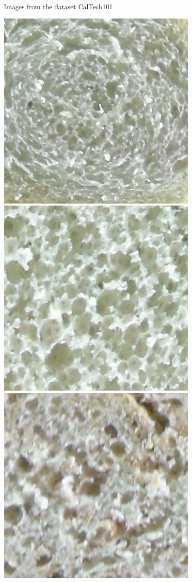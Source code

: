 \documentclass[oneside,a4paper,english,links]{amca}
\begin{document}
\begin{figure}[htb]
\caption{Images from the dataset CalTech101}
\label{fig:nonbread}
\end{figure}

\begin{figure}[htb]
\centering
\includegraphics[scale=0.28]{imagenes/camera/b}
\includegraphics[scale=0.28]{imagenes/camera/l19}
\includegraphics[scale=0.28]{imagenes/camera/s7}

\end{figure}
\end{document}
